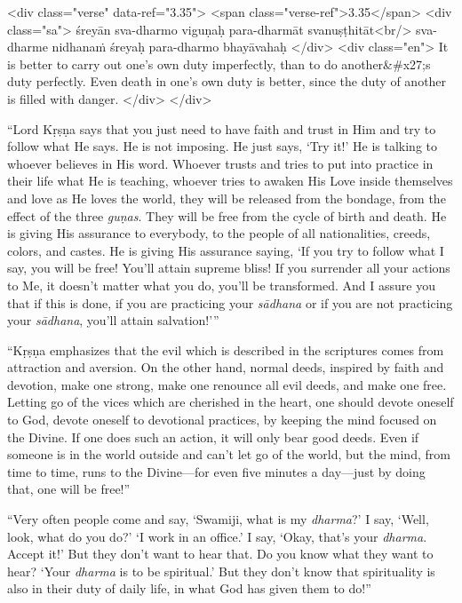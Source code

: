 \begin{html}
<div class="verse" data-ref="3.35">
  <span class="verse-ref">3.35</span>
  <div class="sa">
    śreyān sva-dharmo viguṇaḥ para-dharmāt svanuṣṭhitāt<br/>
    sva-dharme nidhanaṁ śreyaḥ para-dharmo bhayāvahaḥ
  </div>
  <div class="en">
    It is better to carry out one’s own duty imperfectly, than to do another&#x27;s duty perfectly. Even death in one’s own duty is better, since the duty of another is filled with danger.
  </div>
</div>
\end{html}


\enquote{Lord Kṛṣṇa says that you just need to have faith and trust in Him and try to follow what He says. He is not imposing. He just says, \enquote{Try it!} He is talking to whoever believes in His word. Whoever trusts and tries to put into practice in their life what He is teaching, whoever tries to awaken His Love inside themselves and love as He loves the world, they will be released from the bondage, from the effect of the three \textit{guṇas}. They will be free from the cycle of birth and death. He is giving His assurance to everybody, to the people of all nationalities, creeds, colors, and castes. He is giving His assurance saying, \enquote{If you try to follow what I say, you will be free! You’ll attain supreme bliss! If you surrender all your actions to Me, it doesn’t matter what you do, you’ll be transformed. And I assure you that if this is done, if you are practicing your \textit{sādhana} or if you are not practicing your \textit{sādhana}, you’ll attain salvation!}}

\enquote{Kṛṣṇa emphasizes that the evil which is described in the scriptures comes from attraction and aversion. On the other hand, normal deeds, inspired by faith and devotion, make one strong, make one renounce all evil deeds, and make one free. Letting go of the vices which are cherished in the heart, one should devote oneself to God, devote oneself to devotional practices, by keeping the mind focused on the Divine. If one does such an action, it will only bear good deeds. Even if someone is in the world outside and can’t let go of the world, but the mind, from time to time, runs to the Divine---for even five minutes a day---just by doing that, one will be free!}

\enquote{Very often people come and say, \enquote{Swamiji, what is my \textit{dharma}?} I say, \enquote{Well, look, what do you do?} \enquote{I work in an office.} I say, \enquote{Okay, that’s your \textit{dharma}. Accept it!} But they don’t want to hear that. Do you know what they want to hear? \enquote{Your \textit{dharma} is to be spiritual.} But they don’t know that spirituality is also in their duty of daily life, in what God has given them to do!}


